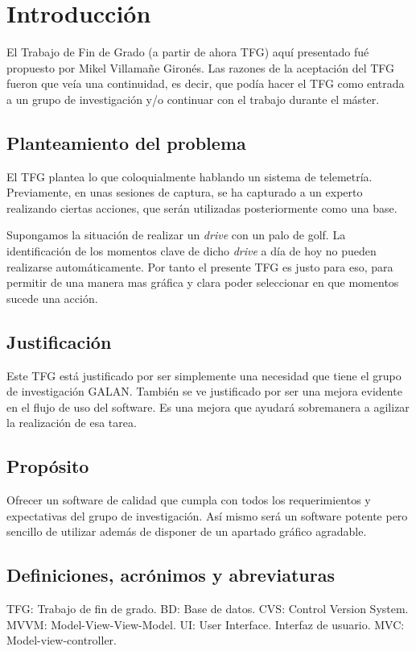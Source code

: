 \chapter{Introducci\'{o}n} 
El Trabajo de Fin de Grado (a partir de ahora TFG) aqu\'{i} presentado fu\'{e} propuesto por Mikel Villama\~{n}e Giron\'{e}s.
Las razones de la aceptaci\'{o}n del TFG fueron que ve\'{i}a una continuidad, es decir, que pod\'{i}a hacer el TFG como entrada
a un grupo de investigaci\'{o}n y/o continuar con el trabajo durante el m\'{a}ster.

\section{Planteamiento del problema}
El TFG plantea lo que coloquialmente hablando un sistema de telemetr\'{i}a. Previamente, en unas sesiones de captura, se ha capturado
a un experto realizando ciertas acciones, que ser\'{a}n utilizadas posteriormente como una base.

Supongamos la situaci\'{o}n de realizar un \emph{drive} con un palo de golf. La identificaci\'{o}n de los momentos clave de dicho \emph{drive}
a d\'{i}a de hoy no pueden realizarse autom\'{a}ticamente. Por tanto el presente TFG es justo para eso, para permitir de una manera
mas gr\'{a}fica y clara poder seleccionar en que momentos sucede una acci\'{o}n.

\section{Justificaci\'{o}n}

Este TFG est\'{a} justificado por ser simplemente una necesidad que tiene el grupo de investigaci\'{o}n GALAN. Tambi\'{e}n se ve justificado
por ser una mejora evidente en el flujo de uso del software. Es una mejora que ayudar\'{a} sobremanera a agilizar la realizaci\'{o}n de esa tarea.

\section{Prop\'{o}sito}
Ofrecer un software de calidad que cumpla con todos los requerimientos y expectativas del grupo de investigaci\'{o}n.
As\'{i} mismo ser\'{a} un software potente pero sencillo de utilizar adem\'{a}s de disponer de un apartado gr\'{a}fico agradable.

\section{Definiciones, acr\'{o}nimos y abreviaturas}
TFG: Trabajo de fin de grado.
BD: Base de datos.
CVS: Control Version System.
MVVM: Model-View-View-Model.
UI: User Interface. Interfaz de usuario.
MVC: Model-view-controller.
 
